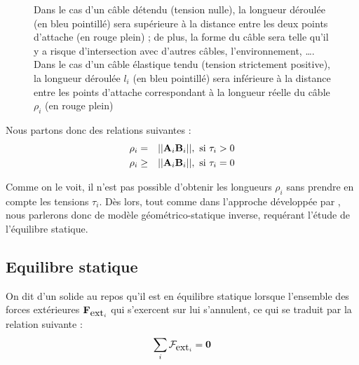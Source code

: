 \begin{figure}[!ht]
  \centering
\hfill
{}
    \caption{\footnotesize{Dans le cas d'un câble détendu (tension nulle), la 
longueur déroulée (en bleu pointill\'e) sera supérieure à la distance entre les 
deux points d'attache (en rouge plein) ; de plus, la forme du câble sera telle 
qu'il y a risque d'intersection avec d'autres câbles, l'environnement, \dots. 
Dans le cas d'un câble élastique tendu (tension strictement positive), la 
longueur déroulée $l_i$ (en bleu pointill\'e) sera inférieure à la 
distance entre les points d'attache correspondant à la longueur réelle du 
câble $\rho_i$ (en rouge plein)}}
\label{intro:fig6}
\end{figure}

Nous partons donc des relations suivantes :
\begin{eqnarray}
\rho_i &=& ||{\bf A}_i {\bf B}_i||, \hbox{ si } \tau_i > 0 \\ 
\rho_i &\geq& ||{\bf A}_i {\bf B}_i||, \hbox{ si } \tau_i = 0
\label{intro:eq1}
\end{eqnarray}

Comme on le voit, il n'est pas possible d'obtenir les longueurs $\rho_i$ sans 
prendre en compte les tensions $\tau_i$. Dès lors, tout comme dans l'approche 
développée par \cite{2010:Carricato.Merlet}, nous parlerons donc de modèle 
géométrico-statique inverse, requérant l'étude de l'équilibre statique.

\subsection{Equilibre statique} \label{chap0-1-2}

On dit d'un solide au repos qu'il est en équilibre statique lorsque l'ensemble 
des forces extérieures $\mathcal {\bf F}_{\hbox{ext}_i}$ qui s'exercent sur lui 
s'annulent, ce qui se traduit par la relation suivante :
\begin{equation}
\sum_i \boldmath {\mathcal F}_{\hbox{ext}_i} = {\bf 0}
\label{intro:eq2}
\end{equation}

